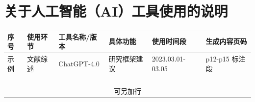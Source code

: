 \section*{关于人工智能（AI）工具使用的说明}
\begin{table}[htbp]
\centering
\setlength{\arrayrulewidth}{0.5pt} %
\linespread{1}\selectfont
\begin{tabular}{|m{1cm}|m{2cm}|m{2.5cm}|m{2cm}|m{2cm}|m{2.5cm}|}
\hline
序号 & 使用环节 & 工具名称/版本 & 具体功能 & 使用时间段 & 生成内容页码 \\
\hline
示例 & 文献综述 & ChatGPT-4.0 & 研究框架建议 & 2023.03.01-03.05 & p12-p15 标注段 \\
\hline
 &  &  &  &  &  \\
\hline
 &  &  &  &  &  \\
\hline
 &  &  &  &  &  \\
\hline
 &  &  &  &  &  \\
\hline
\multicolumn{6}{|c|}{可另加行} \\ %
\hline
\end{tabular}
\end{table}